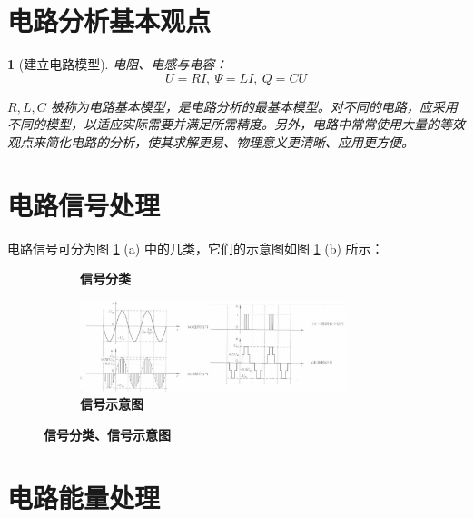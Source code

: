 \documentclass[UTF8]{report}
\theoremstyle{MyLineTheoremStyle} %
\theoremstyle{MyBlockTheoremStyle} %
\theoremstyle{MySubsubsectionStyle} %
\newtheorem{definition}{}
\begin{document}
\section{电路分析基本观点}


\begin{definition}[建立电路模型]
电阻、电感与电容：
\begin{equation}
U = RI,\ \varPsi = LI,\ Q = CU
\end{equation}

$R, L, C$ 被称为电路基本模型，是电路分析的最基本模型。对不同的电路，应采用不同的模型，以适应实际需要并满足所需精度。另外，电路中常常使用大量的等效观点来简化电路的分析，使其求解更易、物理意义更清晰、应用更方便。

\end{definition}


\section{电路信号处理}

电路信号可分为图 \ref{信号分类、信号示意图} (a) 中的几类，它们的示意图如图 \ref{信号分类、信号示意图} (b) 所示： 

\begin{figure}[H]\centering
\begin{subfigure}[t]{0.52\textwidth}\centering
    
    \caption{\bfseries 信号分类 }
\end{subfigure}\begin{subfigure}[t]{0.48\textwidth}\centering
    \includegraphics[height=75pt]{assets/1,2/1b9e0bed85e1f3a049de96f4c6018da8.jpg}
    \caption{\bfseries 信号示意图 }
\end{subfigure}
\caption{\bfseries 信号分类、信号示意图 }\label{信号分类、信号示意图}
\end{figure}

\section{电路能量处理}
\end{document}
